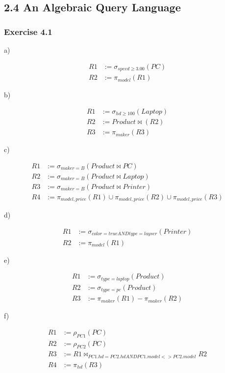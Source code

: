 \documentclass[../../main.tex]{subfiles}
\begin{document}
\subsection*{2.4 An Algebraic Query Language}

\subsubsection*{Exercise 4.1}

a)

\begin{align*}
  R1 &:= \sigma_{speed \geq 3.00}(PC) \\
  R2 &:= \pi_{model}(R1)
\end{align*}

b)

\begin{align*}
  R1 &:= \sigma_{hd \geq 100}(Laptop) \\
  R2 &:= Product \bowtie (R2) \\
  R3 &:= \pi_{maker}(R3)
\end{align*}

c)

\begin{align*}
  R1 &:= \sigma_{maker=B}(Product \bowtie PC) \\
  R2 &:= \sigma_{maker=B}(Product \bowtie Laptop) \\
  R3 &:= \sigma_{maker=B}(Product \bowtie Printer) \\
  R4 &:= \pi_{model, price}(R1) \cup \pi_{model, price}(R2)
         \cup \pi_{model, price}(R3)
\end{align*}

d)

\begin{align*}
  R1 &:= \sigma_{color=true AND type=layser}(Printer) \\
  R2 &:= \pi_{model}(R1)
\end{align*}

e)

\begin{align*}
  R1 &:= \sigma_{type=laptop}(Product) \\
  R2 &:= \sigma_{type=pc}(Product) \\
  R3 &:= \pi_{maker}(R1) - \pi_{maker}(R2)
\end{align*}

f)

\begin{align*}
  R1 &:= \rho_{PC1}(PC) \\
  R2 &:= \rho_{PC2}(PC) \\
  R3 &:= R1 \bowtie_{PC1.hd = PC2.hd AND PC1.model <> PC2.model} R2 \\
  R4 &:= \pi_{hd}(R3)
\end{align*}
\end{document}
